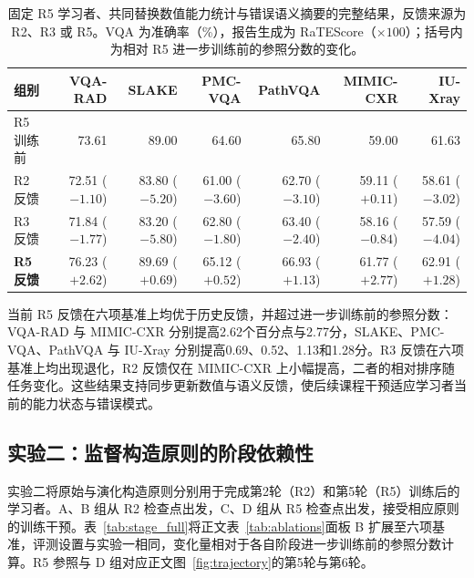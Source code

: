\begin{table}[H]
\centering\scriptsize
\caption{固定 R5 学习者、共同替换数值能力统计与错误语义摘要的完整结果，反馈来源为 R2、R3 或 R5。VQA 为准确率（\%），报告生成为 RaTEScore（$\times100$）；括号内为相对 R5 进一步训练前的参照分数的变化。}
\label{tab:feedback_full}
\setlength{\tabcolsep}{3pt}
\renewcommand{\arraystretch}{1.18}
\begin{tabularx}{\linewidth}{@{}Yrrrrrr@{}}
\toprule
组别 & VQA-RAD & SLAKE & PMC-VQA & PathVQA & MIMIC-CXR & IU-Xray\\
\midrule
R5 训练前 & 73.61 & 89.00 & 64.60 & 65.80 & 59.00 & 61.63\\
R2 反馈 & 72.51 ($-1.10$) & 83.80 ($-5.20$) & 61.00 ($-3.60$) & 62.70 ($-3.10$) & 59.11 ($+0.11$) & 58.61 ($-3.02$)\\
R3 反馈 & 71.84 ($-1.77$) & 83.20 ($-5.80$) & 62.80 ($-1.80$) & 63.40 ($-2.40$) & 58.16 ($-0.84$) & 57.59 ($-4.04$)\\
 \textbf{R5 反馈} & 76.23 ($+2.62$) & 89.69 ($+0.69$) & 65.12 ($+0.52$) & 66.93 ($+1.13$) & 61.77 ($+2.77$) & 62.91 ($+1.28$)\\
\bottomrule
\end{tabularx}
\end{table}

当前 R5 反馈在六项基准上均优于历史反馈，并超过进一步训练前的参照分数：VQA-RAD 与 MIMIC-CXR 分别提高2.62个百分点与2.77分，SLAKE、PMC-VQA、PathVQA 与 IU-Xray 分别提高0.69、0.52、1.13和1.28分。R3 反馈在六项基准上均出现退化，R2 反馈仅在 MIMIC-CXR 上小幅提高，二者的相对排序随任务变化。这些结果支持同步更新数值与语义反馈，使后续课程干预适应学习者当前的能力状态与错误模式。

\subsection{实验二：监督构造原则的阶段依赖性}
\label{app:stage_transfer}

实验二将原始与演化构造原则分别用于完成第2轮（R2）和第5轮（R5）训练后的学习者。A、B 组从 R2 检查点出发，C、D 组从 R5 检查点出发，接受相应原则的训练干预。表~\ref{tab:stage_full}将正文表~\ref{tab:ablations}面板 B 扩展至六项基准，评测设置与实验一相同，变化量相对于各自阶段进一步训练前的参照分数计算。R5 参照与 D 组对应正文图~\ref{fig:trajectory}的第5轮与第6轮。

